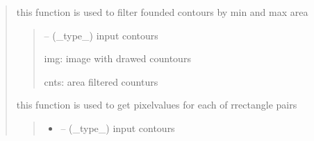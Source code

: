 \documentclass[letterpaper,10pt,english]{sphinxmanual}
\begin{document}
\begin{quote}
\begin{savenotes}
\begin{fulllineitems}
\begin{savenotes}
\begin{fulllineitems}
\end{fulllineitems}\end{savenotes}


\begin{savenotes}\begin{fulllineitems}
\label{\detokenize{setting/backend/pxvalue_calibration:oxin.backend.pxvalue_calibration.extract_info.filter_contours_by_area}}
\pysigstartsignatures
{}
\pysigstopsignatures
\sphinxAtStartPar
this function is used to filter founded contours by min and max area
\begin{quote}\begin{description}
\sphinxAtStartPar
{} – (\_type\_) input contours

\sphinxAtStartPar
img: image with drawed countours

\sphinxAtStartPar
cnts: area filtered counturs

\end{description}\end{quote}

\end{fulllineitems}\end{savenotes}


\begin{savenotes}\begin{fulllineitems}
\label{\detokenize{setting/backend/pxvalue_calibration:oxin.backend.pxvalue_calibration.extract_info.final_decision}}
\pysigstartsignatures
{}
\pysigstopsignatures
\sphinxAtStartPar
this function is used to get pixel\sphinxhyphen{}values for each of rrectangle pairs
\begin{quote}\begin{description}
\begin{itemize}
\item {} 
\sphinxAtStartPar
{} – (\_type\_) input contours


\end{itemize}
\end{description}
\end{quote}
\end{fulllineitems}
\end{savenotes}
\end{fulllineitems}
\end{savenotes}
\end{quote}
\end{document}
